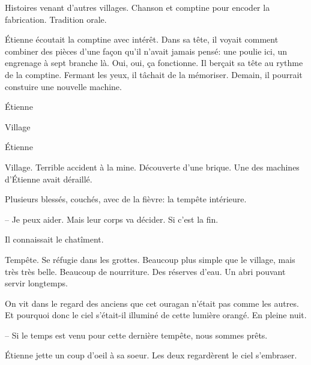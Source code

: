 Histoires venant d'autres villages. Chanson et comptine pour encoder la fabrication. 
Tradition orale.

Étienne écoutait la comptine avec intérêt. Dans sa tête, il voyait comment combiner des pièces d'une
façon qu'il n'avait jamais pensé: une poulie ici, un engrenage à sept branche là. Oui, oui, ça fonctionne.
Il berçait sa tête au rythme de la comptine. Fermant les yeux, il tâchait de la mémoriser.
Demain, il pourrait constuire une nouvelle machine.

\sautSection{}

Étienne 

\sautSection{}

Village 

\sautSection{}

Étienne

\sautSection{}

Village. Terrible accident à la mine. Découverte d'une brique.
Une des machines d'Étienne avait déraillé.

Plusieurs blessés, couchés, avec de la fièvre: la tempête intérieure.

-- Je peux aider. Mais leur corps va décider. Si c'est la fin.


Il connaissait le chatîment.

\sautSection{}

Tempête. Se réfugie dans les grottes. Beaucoup plus simple que le village, mais très très belle.
Beaucoup de nourriture. Des réserves d'eau. Un abri pouvant servir longtemps.


On vit dans le regard des anciens que cet ouragan n'était pas comme les autres.
Et pourquoi donc le ciel s'était-il illuminé de cette lumière orangé. En pleine nuit.

-- Si le temps est venu pour cette dernière tempête, nous sommes prêts.

Étienne jette un coup d'oeil à sa soeur. Les deux regardèrent le ciel s'embraser.
